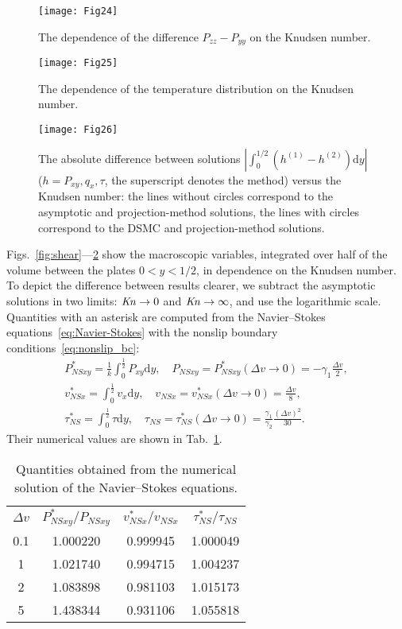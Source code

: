 \documentclass[]{jfm}
\newcommand{\Kn}{\mbox{\textit{Kn}}}
\newcommand{\NS}{N\!S}
\newcommand{\dd}{\mathrm{d}}
\begin{document}
\begin{figure}
    \centering
    \texttt{[image: Fig24]}
    \caption{The dependence of the difference \(P_{zz}-P_{yy}\) on the Knudsen number.}
    \label{fig:pzz}
\end{figure}

\begin{figure}
    \centering
    \texttt{[image: Fig25]}
    \caption{The dependence of the temperature distribution on the Knudsen number.}
    \label{fig:temp}
\end{figure}

\begin{figure}
    \centering
    \texttt{[image: Fig26]}
    \caption{The absolute difference between solutions \(|\int_0^{1/2} (h^{(1)}-h^{(2)})\dd{y}|\)
        (\(h = P_{xy}, q_x, \tau\), the superscript denotes the method) versus the Knudsen number:
        the lines without circles correspond to the asymptotic and projection-method solutions,
        the lines with circles correspond to the DSMC and projection-method solutions.}
    \label{fig:diff}
\end{figure}

Figs.~\ref{fig:shear}---\ref{fig:temp} show the macroscopic variables,
integrated over half of the volume between the plates \(0<y<1/2\), in dependence on the Knudsen number.
To depict the difference between results clearer,
we subtract the asymptotic solutions in two limits: \(\Kn\to0\) and \(\Kn\to\infty\),
and use the logarithmic scale.
Quantities with an asterisk are computed from the Navier--Stokes equations~\eqref{eq:Navier-Stokes}
with the nonslip boundary conditions~\eqref{eq:nonslip_bc}:
\begin{gather*}
    P_{\NS xy}^* = \frac1k \int_0^\frac12 P_{xy} \dd{y}, \quad P_{\NS xy} = P_{\NS xy}^*(\Delta{v}\to0) = -\gamma_1\frac{\Delta{v}}2, \\
    v_{\NS x}^* = \int_0^\frac12 v_x \dd{y}, \quad v_{\NS x} = v_{\NS x}^*(\Delta{v}\to0) = \frac{\Delta{v}}8, \\
    \tau_{\NS}^* = \int_0^\frac12 \tau \dd{y}, \quad
        \tau_{\NS} = \tau_{\NS}^*(\Delta{v}\to0) = \frac{\gamma_1}{\gamma_2}\frac{(\Delta{v})^2}{30}.
\end{gather*}
Their numerical values are shown in Tab.~\ref{table:NS_params}.

\begin{table}
    \centering
    \begin{tabular}{cccc}
        \(\Delta{v}\) & \(\displaystyle P_{\NS xy}^*/P_{\NS xy}\) & \(\displaystyle v_{\NS x}^*/v_{\NS x}\) & \(\displaystyle \tau_{\NS}^*/\tau_{\NS}\) \\[3pt]
        0.1 & 1.000220 & 0.999945 & 1.000049 \\
          1 & 1.021740 & 0.994715 & 1.004237 \\
          2 & 1.083898 & 0.981103 & 1.015173 \\
          5 & 1.438344 & 0.931106 & 1.055818 \\
    \end{tabular}
    \caption{Quantities obtained from the numerical solution of the Navier--Stokes equations.}
    \label{table:NS_params}
\end{table}
\end{document}
